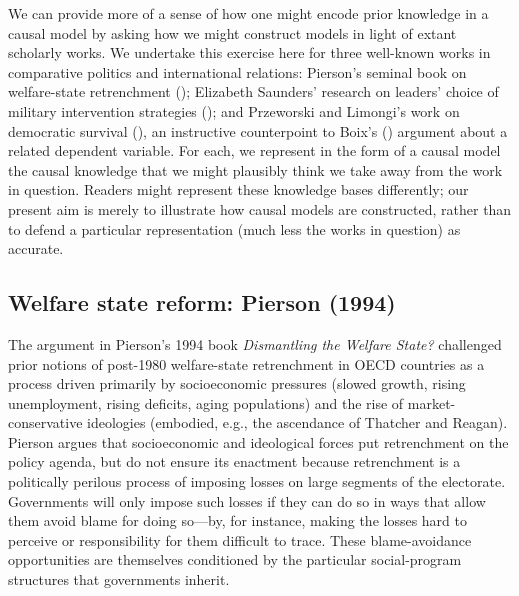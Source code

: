\documentclass[
  12pt,
]{book}
\begin{document}
We can provide more of a sense of how one might encode prior knowledge in a causal model by asking how we might construct models in light of extant scholarly works. We undertake this exercise here for three well-known works in comparative politics and international relations: Pierson's seminal book on welfare-state retrenchment (\citet{pierson1994dismantling}); Elizabeth Saunders' research on leaders' choice of military intervention strategies (\citet{saunders2011leaders}); and Przeworski and Limongi's work on democratic survival (\citet{przeworski1997modernization}), an instructive counterpoint to Boix's (\citet{boix2003democracy}) argument about a related dependent variable. For each, we represent in the form of a causal model the causal knowledge that we might plausibly think we take away from the work in question. Readers might represent these knowledge bases differently; our present aim is merely to illustrate how causal models are constructed, rather than to defend a particular representation (much less the works in question) as accurate.

\hypertarget{welfare-state-reform-pierson-1994}{%
\subsection{Welfare state reform: Pierson (1994)}\label{welfare-state-reform-pierson-1994}}

The argument in Pierson's 1994 book \emph{Dismantling the Welfare State?} challenged prior notions of post-1980 welfare-state retrenchment in OECD countries as a process driven primarily by socioeconomic pressures (slowed growth, rising unemployment, rising deficits, aging populations) and the rise of market-conservative ideologies (embodied, e.g., the ascendance of Thatcher and Reagan). Pierson argues that socioeconomic and ideological forces put retrenchment on the policy agenda, but do not ensure its enactment because retrenchment is a politically perilous process of imposing losses on large segments of the electorate. Governments will only impose such losses if they can do so in ways that allow them avoid blame for doing so---by, for instance, making the losses hard to perceive or responsibility for them difficult to trace. These blame-avoidance opportunities are themselves conditioned by the particular social-program structures that governments inherit.
\end{document}
